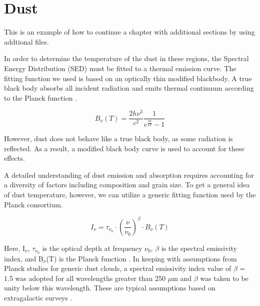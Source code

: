 
\section{Dust}
 
This is an example of how to continue a chapter with additional sections by
using addtional files.  

In order to determine the temperature of the dust in these regions, 
the Spectral Energy Distribution (SED)  must be fitted to a thermal 
emission curve. The fitting function we used is based on an optically 
thin modified blackbody. A true black body absorbs all incident 
radiation and emits thermal continuum according to the 
Planck function \cite{irwin2007}.

\begin{equation}
B_{\nu}(T) = \frac{2h\nu^3}{c^2} \frac{1}{e^{\frac{h\nu}{kT}}-1}
\end{equation}

\noindent However, dust does not behave like a true black body, 
as some radiation is reflected. As a result, a modified black body 
curve is used to account for these effects. 

A detailed understanding of dust emission and absorption  requires accounting
for a diversity of factors including composition and grain size. To get a
general idea of dust temperature, however, we can utilize a generic fitting
function used by the Planck consortium.

\begin{equation}
I_{\nu} = \tau_{\nu_0} \cdot (\frac{\nu}{\nu_0})^{\beta} \cdot B_{\nu}(T)
\end{equation}

\noindent Here, I$_{\nu}$, $\tau_{\nu_0}$ is the optical depth at frequency
$\nu_0$, $\beta$ is the spectral emissivity index, and B$_{\nu}$(T) is the
Planck function \cite{planck2011thermal}. In keeping with assumptions from
Planck studies for generic dust clouds, a spectral emissivity index value of
$\beta$ = 1.5 was adopted for all wavelengths greater than 250 $\mu$m and
$\beta$ was taken to be unity below this wavelength. These are typical
assumptions based on extragalactic surveys \cite{planck2015}.

